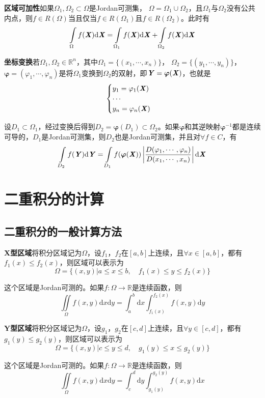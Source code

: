 \documentclass[UTF8,openany]{book}
\begin{document}
	\par \textbf{区域可加性}\quad 如果$\Omega_1,\Omega_2\subset\Omega$是Jordan可测集，
	$\Omega=\Omega_1\cup\Omega_2$，且$\Omega_1$与$\Omega_2$没有公共内点，则$f\in R(\Omega)$当且仅当$f\in R(\Omega_1)$且$f\in R(\Omega_2)$。此时有
	$$\int\limits_{\Omega}f(\textbf{\textit{X}})\mathrm{d}\textbf{\textit{X}}=
	\int\limits_{\Omega_1}f(\textbf{\textit{X}})\mathrm{d}\textbf{\textit{X}}+
	\int\limits_{\Omega_2}f(\textbf{\textit{X}})\mathrm{d}\textbf{\textit{X}}$$
	\par \textbf{坐标变换}\quad 若$\Omega_1,\Omega_2\in\mathbb{R}^n$，其中$\Omega_1=\{(x_1,\cdots,x_n)\}$，
	$\Omega_2=\{(y_1,\cdots,y_n)\}$，$\boldsymbol{\varphi}=(\varphi_1,\cdots,\varphi_n)$是将$\Omega_1$变换到$\Omega_2$的双射，即$\textbf{\textit{Y}}=\boldsymbol{\varphi}(\textbf{\textit{X}})$，也就是
	$$\begin{cases}
	y_1=\varphi_1(\textbf{\textit{X}})\\
	\cdots\\
	y_n=\varphi_n(\textbf{\textit{X}})\\
	\end{cases}$$
	\par 设$D_1\subset\Omega_1$，经过变换后得到$D_2=\boldsymbol{\varphi}(D_1)\subset\Omega_2$。如果$\boldsymbol{\varphi}$和其逆映射$\boldsymbol{\varphi}^{-1}$都是连续可导的，$D_1$是Jordan可测集，则$D_2$也是Jordan可测集，并且对$\forall f\in C$，有
	$$\int\limits_{D_2}f(\textbf{\textit{Y}})\mathrm{d}\textbf{\textit{Y}}=
	\int\limits_{D_1}f(\boldsymbol{\varphi}(\textbf{\textit{X}}))
	\left|\frac{D(\varphi_1,\cdots,\varphi_n)}{D(x_1,\cdots,x_n)}\right|\mathrm{d}\textbf{\textit{X}}$$
	\section{二重积分的计算}
	\subsection{二重积分的一般计算方法}
	\textbf{X型区域}\quad 将积分区域记为$\Omega$，设$f_1$，$f_2$在$[a,b]$上连续，且$\forall x\in[a,b]$，都有$f_1(x)\leqslant f_2(x)$，则区域可以表示为
	$$\Omega=\{(x,y)|a\leqslant x\leqslant b,\quad f_1(x)\leqslant y\leqslant f_2(x)\}$$
	\par 这个区域是Jordan可测的。如果$f:\Omega\rightarrow\mathbb{R}$是连续函数，则
	$$\iint\limits_{\Omega}f(x,y)\mathrm{d}x\mathrm{d}y=
	\int_{a}^{b}\mathrm{d}x\int_{f_1(x)}^{f_2(x)}f(x,y)\mathrm{d}y$$
	\par \textbf{Y型区域}\quad 将积分区域记为$\Omega$，设$g_1$，$g_2$在$[c,d]$上连续，且$\forall y\in[c,d]$，都有$g_1(y)\leqslant g_2(y)$，则区域可以表示为
	$$\Omega=\{(x,y)|c\leqslant y\leqslant d,\quad g_1(y)\leqslant x\leqslant g_2(y)\}$$
	\par 这个区域是Jordan可测的。如果$f:\Omega\rightarrow\mathbb{R}$是连续函数，则
	$$\iint\limits_{\Omega}f(x,y)\mathrm{d}x\mathrm{d}y=
	\int_{c}^{d}\mathrm{d}y\int_{g_1(y)}^{g_2(y)}f(x,y)\mathrm{d}x$$
\end{document}
